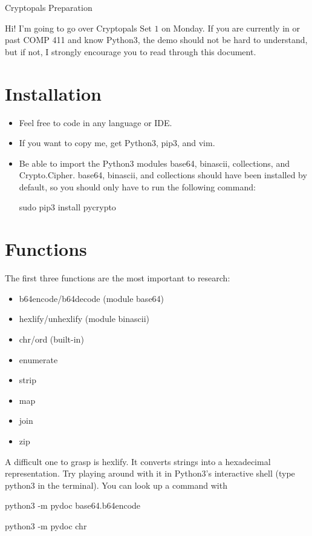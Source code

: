 \documentclass{article}
\begin{document}
\centerline{\sc \large Cryptopals Preparation}
\vspace{1pc}
Hi! I'm going to go over Cryptopals Set $1$ on Monday. If you are currently in or past COMP 411 and know Python3, the demo should not be hard to understand, but if not, I strongly encourage you to read through this document.

\section{Installation}
\begin{itemize}
	\item Feel free to code in any language or IDE.
	\item If you want to copy me, get Python3, pip3, and vim.
	\item Be able to import the Python3 modules base64, binascii, collections, and Crypto.Cipher. base64, binascii, and collections should have been installed by default, so you should only have to run the following command:
		\begin{center}
			sudo pip3 install pycrypto
		\end{center}
\end{itemize}

\section{Functions}
The first three functions are the most important to research:
\begin{itemize}
	\item b64encode/b64decode (module base64)
	\item hexlify/unhexlify (module binascii)
	\item chr/ord (built-in)
	\item enumerate
	\item strip
	\item map
	\item join
	\item zip
\end{itemize}

A difficult one to grasp is hexlify. It converts strings into a hexadecimal representation. Try playing around with it in Python3's interactive shell (type python3 in the terminal). You can look up a command with
\begin{center}
	python3 -m pydoc base64.b64encode
	
	python3 -m pydoc chr
\end{center}
\end{document}
